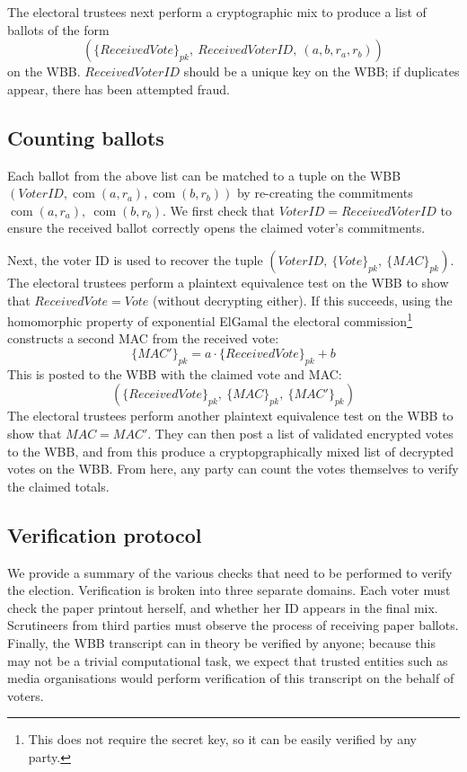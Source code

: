 \documentclass[11pt,twoside,a4paper]{article}
\DeclareMathOperator{\com}{com}
\theoremstyle{definition}
\begin{document}
The electoral trustees next perform a cryptographic mix to produce a list of ballots of the form
\[\left(\{ReceivedVote\}_{pk},\ ReceivedVoterID,\ (a,b,r_a,r_b)\right)\]
on the WBB. \(ReceivedVoterID\) should be a unique key on the WBB; if duplicates appear, there has been attempted fraud.
\subsection{Counting ballots}
Each ballot from the above list can be matched to a tuple on the WBB \((VoterID, \com(a,r_a), \com(b,r_b))\) by re-creating the commitments \(\com(a,r_a),\ \com(b, r_b)\). We first check that \(VoterID=ReceivedVoterID\) to ensure the received ballot correctly opens the claimed voter's commitments.

Next, the voter ID is used to recover the tuple \((VoterID,\ \{Vote\}_{pk},\ \{MAC\}_{pk})\). The electoral trustees perform a plaintext equivalence test on the WBB to show that \(ReceivedVote=Vote\) (without decrypting either). If this succeeds, using the homomorphic property of exponential ElGamal the electoral commission\footnote{This does not require the secret key, so it can be easily verified by any party.} constructs a second MAC from the received vote:
\[\{MAC'\}_{pk}=a\cdot\{ReceivedVote\}_{pk}+b\]
This is posted to the WBB with the claimed vote and MAC:
\[\left(\{ReceivedVote\}_{pk},\ \{MAC\}_{pk},\ \{MAC'\}_{pk}\right)\]
The electoral trustees perform another plaintext equivalence test on the WBB to show that \(MAC=MAC'\). They can then post a list of validated encrypted votes to the WBB, and from this produce a cryptopgraphically mixed list of decrypted votes on the WBB. From here, any party can count the votes themselves to verify the claimed totals.
\subsection{Verification protocol}
We provide a summary of the various checks that need to be performed to verify the election. Verification is broken into three separate domains. Each voter must check the paper printout herself, and whether her ID appears in the final mix. Scrutineers from third parties must observe the process of receiving paper ballots. Finally, the WBB transcript can in theory be verified by anyone; because this may not be a trivial computational task, we expect that trusted entities such as media organisations would perform verification of this transcript on the behalf of voters.
\end{document}
